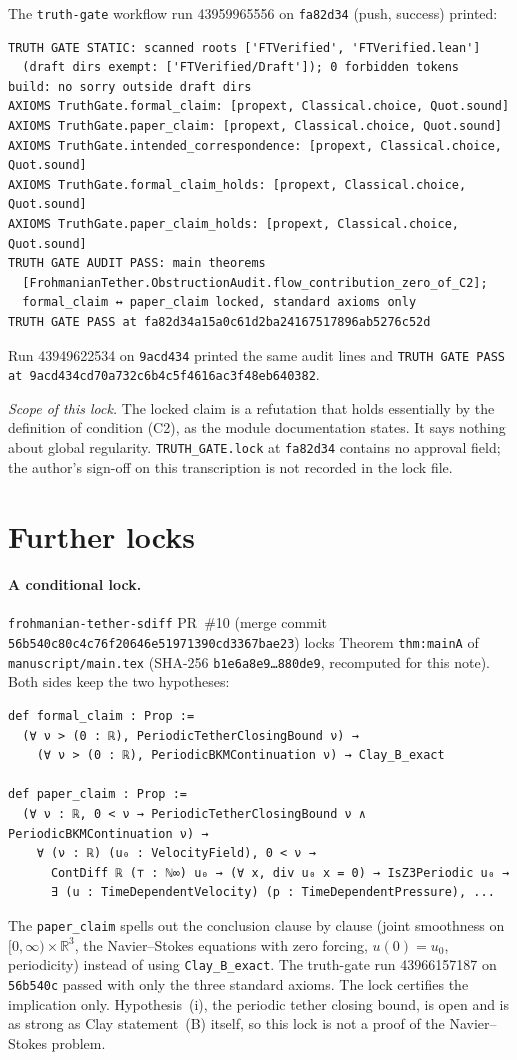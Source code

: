 \documentclass[11pt,a4paper]{article}
\newcommand{\code}[1]{\texttt{#1}}
\begin{document}
The \code{truth-gate} workflow run 43959965556 on \code{fa82d34} (push, success) printed:
\begin{Verbatim}
TRUTH GATE STATIC: scanned roots ['FTVerified', 'FTVerified.lean']
  (draft dirs exempt: ['FTVerified/Draft']); 0 forbidden tokens
build: no sorry outside draft dirs
AXIOMS TruthGate.formal_claim: [propext, Classical.choice, Quot.sound]
AXIOMS TruthGate.paper_claim: [propext, Classical.choice, Quot.sound]
AXIOMS TruthGate.intended_correspondence: [propext, Classical.choice, Quot.sound]
AXIOMS TruthGate.formal_claim_holds: [propext, Classical.choice, Quot.sound]
AXIOMS TruthGate.paper_claim_holds: [propext, Classical.choice, Quot.sound]
TRUTH GATE AUDIT PASS: main theorems
  [FrohmanianTether.ObstructionAudit.flow_contribution_zero_of_C2];
  formal_claim ↔ paper_claim locked, standard axioms only
TRUTH GATE PASS at fa82d34a15a0c61d2ba24167517896ab5276c52d
\end{Verbatim}
Run 43949622534 on \code{9acd434} printed the same audit lines and
\code{TRUTH GATE PASS at 9acd434cd70a732c6b4c5f4616ac3f48eb640382}.

\emph{Scope of this lock.} The locked claim is a refutation that holds essentially by the
definition of condition (C2), as the module documentation states. It says nothing about global
regularity. \code{TRUTH\_GATE.lock} at \code{fa82d34} contains no approval field; the author's
sign-off on this transcription is not recorded in the lock file.

\section{Further locks}

\paragraph{A conditional lock.} \code{frohmanian-tether-sdiff} PR~\#10 (merge commit
\code{56b540c80c4c76f20646e51971390cd3367bae23}) locks Theorem \code{thm:mainA} of
\code{manuscript/main.tex} (SHA-256 \code{b1e6a8e9\ldots880de9}, recomputed for this note).
Both sides keep the two hypotheses:
\begin{Verbatim}
def formal_claim : Prop :=
  (∀ ν > (0 : ℝ), PeriodicTetherClosingBound ν) →
    (∀ ν > (0 : ℝ), PeriodicBKMContinuation ν) → Clay_B_exact

def paper_claim : Prop :=
  (∀ ν : ℝ, 0 < ν → PeriodicTetherClosingBound ν ∧ PeriodicBKMContinuation ν) →
    ∀ (ν : ℝ) (u₀ : VelocityField), 0 < ν →
      ContDiff ℝ (⊤ : ℕ∞) u₀ → (∀ x, div u₀ x = 0) → IsZ3Periodic u₀ →
      ∃ (u : TimeDependentVelocity) (p : TimeDependentPressure), ...
\end{Verbatim}
The \code{paper\_claim} spells out the conclusion clause by clause (joint smoothness on
$[0,\infty)\times\mathbb{R}^3$, the Navier--Stokes equations with zero forcing, $u(0)=u_0$,
periodicity) instead of using \code{Clay\_B\_exact}. The truth-gate run 43966157187 on
\code{56b540c} passed with only the three standard axioms. The lock certifies the implication
only. Hypothesis~(i), the periodic tether closing bound, is open and is as strong as Clay
statement~(B) itself, so this lock is not a proof of the Navier--Stokes problem.
\end{document}
